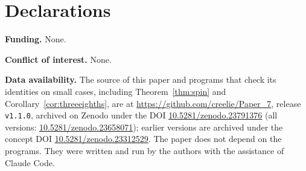 \documentclass[11pt,a4paper,reqno]{amsart}
\theoremstyle{definition}
\begin{document}
\section*{Declarations}
\noindent\textbf{Funding.} None.

\smallskip
\noindent\textbf{Conflict of interest.} None.

\smallskip
\noindent\textbf{Data availability.} The source of this paper and programs that check its identities on small cases, including Theorem~\ref{thm:spin} and Corollary~\ref{cor:threeeighths}, are at \url{https://github.com/creelie/Paper_7}, release \texttt{v1.1.0}, archived on Zenodo under the DOI \href{https://doi.org/10.5281/zenodo.23791376}{10.5281/zenodo.23791376} (all versions: \href{https://doi.org/10.5281/zenodo.23658071}{10.5281/zenodo.23658071}); earlier versions are archived under the concept DOI \href{https://doi.org/10.5281/zenodo.23312529}{10.5281/zenodo.23312529}. The paper does not depend on the programs. They were written and run by the authors with the assistance of Claude Code.
\end{document}
